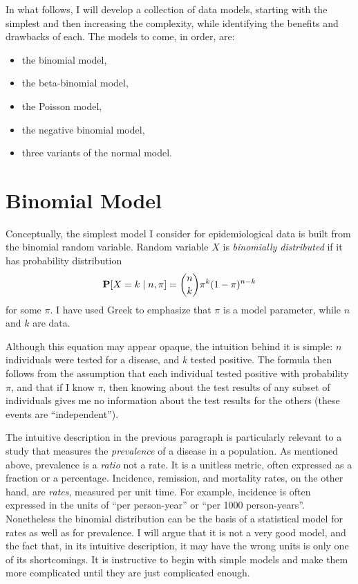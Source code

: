 In what follows, I will develop a collection of data models, starting
with the simplest and then increasing the complexity, while
identifying the benefits and drawbacks of each.  The models to come,
in order, are:
\begin{itemize}
\item the binomial model,
\item the beta-binomial model,
\item the Poisson model,
\item the negative binomial model,
\item three variants of the normal model.
\end{itemize}

\section{Binomial Model}
Conceptually, the simplest model I consider for epidemiological data
is built from the binomial random variable. Random variable $X$ is
\emph{binomially distributed} if it has probability distribution
\[
\mathbf{P}[X=k\;|\; n, \pi] = \binom{n}{k}\pi^k(1-\pi)^{n-k}
\]
for some $\pi$.  I have used Greek to emphasize that $\pi$ is a model
parameter, while $n$ and $k$ are data.

Although this equation may appear opaque, the intuition behind it is
simple: $n$ individuals were tested for a disease, and $k$ tested
positive. The formula then follows from the assumption that each
individual tested positive with probability $\pi$, and that if I know
$\pi$, then knowing about the test results of any subset of
individuals gives me no information about the test results for the
others (these events are ``independent'').

The intuitive description in the previous paragraph is particularly
relevant to a study that measures the \emph{prevalence} of a disease
in a population.  As mentioned above, prevalence is a \emph{ratio} not
a rate.  It is a unitless metric, often expressed as a fraction or a
percentage.  Incidence, remission, and mortality rates, on the other
hand, are \emph{rates}, measured per unit time.  For example,
incidence is often expressed in the units of ``per person-year'' or
``per 1000 person-years''.  Nonetheless the binomial distribution can
be the basis of a statistical model for rates as well as for
prevalence.  I will argue that it is not a very good model, and the
fact that, in its intuitive description, it may have the wrong units is
only one of its shortcomings.  It is instructive to
begin with simple models and make them more complicated until they
are just complicated enough.

